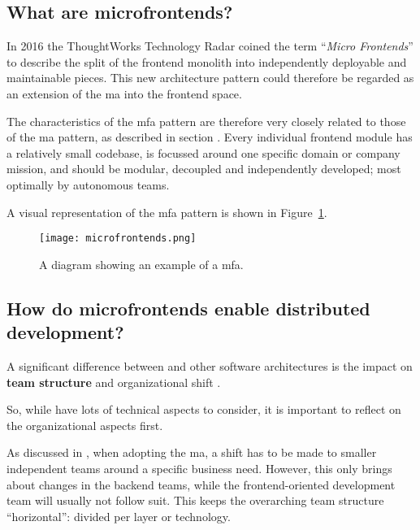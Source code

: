 \subsection{What are microfrontends?}

In 2016 the ThoughtWorks Technology Radar \autocite{ThoughtWorks_2020} coined
the term ``\textit{Micro Frontends}'' to describe the split of the
\gls{frontend} \gls{monolith} into independently deployable and maintainable
pieces. This new architecture pattern could therefore be regarded as an
extension of the \gls{ma} into the \gls{frontend} space.

The characteristics of the \gls{mfa} pattern are therefore very closely related
to those of the \gls{ma} pattern, as described in section
. Every individual \gls{frontend} module has a
relatively small codebase, is focussed around one specific domain or company
mission, and should be modular, decoupled and independently developed; most
optimally by autonomous teams.

A visual representation of the \gls{mfa} pattern is shown in
Figure~\ref{fig:microfrontends}.


\begin{figure}
  \centering
  \texttt{[image: microfrontends.png]}
  \caption[Microfrontends]{A diagram showing an example of a
  \gls{mfa}.}
  \label{fig:microfrontends}
\end{figure}

\subsection{How do microfrontends enable distributed development?}

A significant difference between  and other software
architectures is the impact on \textbf{team structure} and organizational shift
\autocite{Geers_2020}.

So, while  have lots of technical aspects to consider,
it is important to reflect on the organizational aspects first.

As discussed in , when adopting the \gls{ma}, a shift
has to be made to smaller independent teams around a specific business need.
However, this only brings about changes in the \gls{backend} teams, while the
\gls{frontend}-oriented development team will usually not follow suit. This
keeps the overarching team structure ``horizontal'': divided per layer or
technology.

